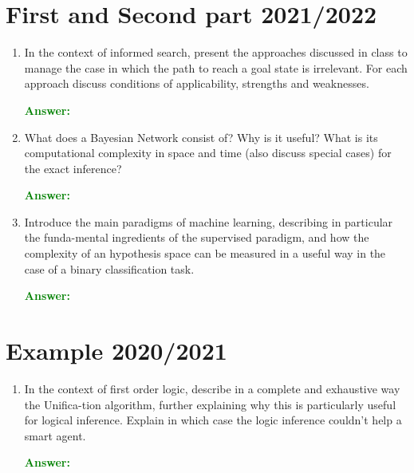 \documentclass[12pt]{article}
\begin{document}
\section{First and Second part 2021/2022}
\begin{enumerate}[label=\textbf{B.\arabic*}]

    \item In the context of informed search, present the approaches discussed in class to manage the case in which the path to reach a goal state is irrelevant. 
    For each approach discuss conditions of applicability, strengths and weaknesses.
    
    \textcolor{green}{\textbf{Answer:}}

    \item What does a Bayesian Network consist of? 
    Why is it useful?
    What is its computational complexity in space and time (also discuss special cases) for the exact inference?

    \textcolor{green}{\textbf{Answer:}}

    \item Introduce the main paradigms of machine learning, describing in particular the funda-mental ingredients of the supervised paradigm, and how the complexity of an hypothesis space can be measured in a useful way in the case of a binary classification task.

    \textcolor{green}{\textbf{Answer:}}

\end{enumerate}

\section{Example 2020/2021}
\begin{enumerate}[label=\textbf{C.\arabic*}]


    \item In the context of first order logic, describe in a complete and exhaustive way the Unifica-tion algorithm, further explaining why this is particularly useful for logical inference.
    Explain in which case the logic inference couldn't help a smart agent.
    
    \textcolor{green}{\textbf{Answer:}}

\end{enumerate}
\end{document}

